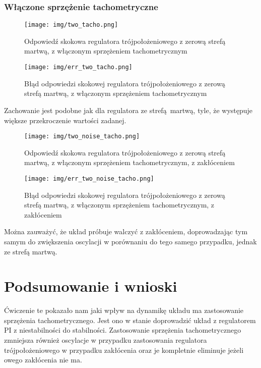 \documentclass[a4paper, 12pt, titlepage]{article}
\begin{document}
			\subsubsection{Włączone sprzężenie tachometryczne}
				\begin{figure}[H]
					\centering
					\texttt{[image: img/two\_tacho.png]}
						\caption{Odpowiedź skokowa regulatora trójpołożeniowego z zerową strefą martwą, z włączonym sprzężeniem tachometrycznym}
				\end{figure}
				\begin{figure}[H]
					\centering
					\texttt{[image: img/err\_two\_tacho.png]}
					\caption{Błąd odpowiedzi skokowej regulatora trójpołożeniowego z zerową strefą martwą, z włączonym sprzężeniem tachometrycznym}
				\end{figure}
				Zachowanie jest podobne jak dla regulatora ze strefą martwą, tyle, że występuje większe przekroczenie wartości zadanej.
				\begin{figure}[H]
					\centering
					\texttt{[image: img/two\_noise\_tacho.png]}
					\caption{Odpowiedź skokowa regulatora trójpołożeniowego z zerową strefą martwą, z włączonym sprzężeniem tachometrycznym, z zakłóceniem}
				\end{figure}
				\begin{figure}[H]
					\centering
					\texttt{[image: img/err\_two\_noise\_tacho.png]}
					\caption{Błąd odpowiedzi skokowej regulatora trójpołożeniowego z zerową strefą martwą, z włączonym sprzężeniem tachometrycznym, z zakłóceniem}
				\end{figure} \noindent
				Można zauważyć, że układ próbuje walczyć z zakłóceniem, doprowadzając tym samym do zwiększenia oscylacji w porównaniu do tego samego przypadku, jednak ze strefą martwą.
	\section{Podsumowanie i wnioski}
		Ćwiczenie te pokazało nam jaki wpływ na dynamikę układu ma zastosowanie sprzężenia tachometrycznego. Jest ono w stanie doprowadzić układ z regulatorem PI z niestabilności do stabilności. Zastosowanie sprzężenia tachometrycznego zmniejsza również oscylacje w przypadku zastosowania regulatora trójpołożeniowego w przypadku zakłócenia oraz je kompletnie eliminuje jeżeli owego zakłócenia nie ma.
\end{document}

